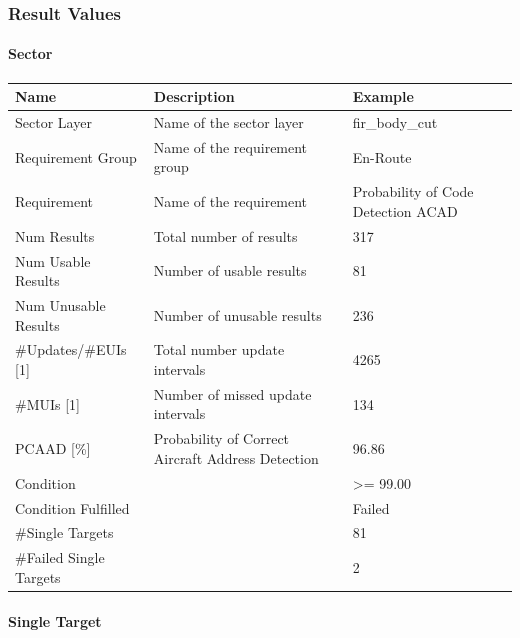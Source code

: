 \subsubsection{Result Values}

\paragraph{Sector}

\begin{center}
 \begin{table}[H]
  \begin{tabularx}{\textwidth}{ | l | X |  l | }
    \hline
    \textbf{Name} & \textbf{Description} & \textbf{Example} \\ \hline
    Sector Layer & Name of the sector layer & fir\_body\_cut \\ \hline
    Requirement Group & Name of the requirement group & En-Route \\ \hline
    Requirement & Name of the requirement & Probability of Code Detection ACAD \\ \hline
    Num Results & Total number of results & 317 \\ \hline
    Num Usable Results & Number of usable results & 81 \\ \hline
    Num Unusable Results & Number of unusable results & 236 \\ \hline
    \#Updates/\#EUIs [1] & Total number update intervals & 4265 \\ \hline
    \#MUIs [1] & Number of missed update intervals & 134 \\ \hline
    PCAAD [\%] & Probability of Correct Aircraft Address Detection & 96.86 \\ \hline
    Condition &  & >= 99.00 \\ \hline
    Condition Fulfilled &  & Failed \\ \hline
    \#Single Targets &  & 81 \\ \hline
    \#Failed Single Targets &  & 2 \\ \hline
\end{tabularx}
\end{table}
\end{center}

\paragraph{Single Target}

